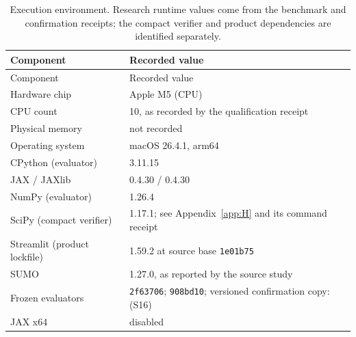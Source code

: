 \documentclass[12pt,a4paper]{article}
\begin{document}
\begingroup
\singlespacing\small
\renewcommand{\thetable}{A2}
\begin{xltabular}{\textwidth}{@{}lY@{}}
\caption[Execution environment]{Execution environment. Research runtime values come from the benchmark and confirmation receipts; the compact verifier and product dependencies are identified separately.}\label{tab:environment} \\
\toprule
Component & Recorded value \\
\midrule\endfirsthead
\toprule Component & Recorded value \\\midrule\endhead
\bottomrule\endfoot
Hardware chip & Apple M5 (CPU) \\
CPU count & 10, as recorded by the qualification receipt \\
Physical memory & not recorded \\
Operating system & macOS 26.4.1, arm64 \\
CPython (evaluator) & 3.11.15 \\
JAX / JAXlib & 0.4.30 / 0.4.30 \\
NumPy (evaluator) & 1.26.4 \\
SciPy (compact verifier) & 1.17.1; see Appendix~\ref{app:H} and its command receipt \\
Streamlit (product lockfile) & 1.59.2 at source base \texttt{1e01b75} \\
SUMO & 1.27.0, as reported by the source study \cite{ref47} \\
Frozen evaluators & \texttt{2f63706}; \texttt{908bd10}; versioned confirmation copy:  (S16) \\
JAX x64 & disabled \\
\end{xltabular}
\endgroup
\end{document}
